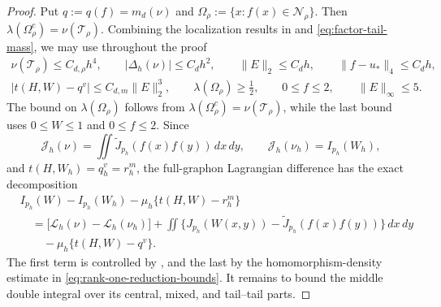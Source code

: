 \begin{proof}
Put $q:=q(f)=m_d(\nu)$ and
$\Omega_\rho:=\{x:f(x)\in\mathcal N_\rho\}$.  Then
$\lambda(\Omega_\rho^c)=\nu(\mathcal T_\rho)$.
Combining the localization results in 
and \eqref{eq:factor-tail-mass}, we may use throughout the proof
\begin{equation}\label{eq:graphon-comparison-estimates}
  \begin{gathered}
    \nu(\mathcal T_\rho)\le C_{d,\rho}h^4,
    \qquad |\Delta_h(\nu)|\le C_dh^2,
    \qquad \|E\|_2\le C_dh,
    \qquad \|f-u_*\|_4\le C_dh,\\
    |t(H,W)-q^v|\le C_{d,m}\|E\|_2^3,
    \qquad \lambda(\Omega_\rho)\ge\frac12,
    \qquad 0\le f\le2,
    \qquad \|E\|_\infty\le5.
  \end{gathered}
\end{equation}
The bound on $\lambda(\Omega_\rho)$ follows from
$\lambda(\Omega_\rho^c)=\nu(\mathcal T_\rho)$, while the last bound uses
$0\le W\le1$ and $0\le f\le2$.
Since
\[
  \mathcal J_h(\nu)
  =\iint\widetilde J_{p_h}(f(x)f(y))\,dx\,dy,
  \qquad
  \mathcal J_h(\nu_h)=I_{p_h}(W_h),
\]
and $t(H,W_h)=q_h^v=r_h^m$, the full-graphon Lagrangian difference has the
exact decomposition
\begin{equation*}
\begin{aligned}
  &I_{p_h}(W)-I_{p_h}(W_h)-\mu_h\{t(H,W)-r_h^m\}\\
  &\quad=\bigl[\mathcal L_h(\nu)-\mathcal L_h(\nu_h)\bigr]
  +\iint\{J_{p_h}(W(x,y))-\widetilde J_{p_h}(f(x)f(y))\}\,dx\,dy\\
  &\qquad-\mu_h\{t(H,W)-q^v\}.
\end{aligned}
\end{equation*}
The first term is controlled by , and
the last by the homomorphism-density estimate in
\eqref{eq:rank-one-reduction-bounds}.  It remains to bound the middle
double integral over its central, mixed, and tail--tail parts.


\end{proof}

